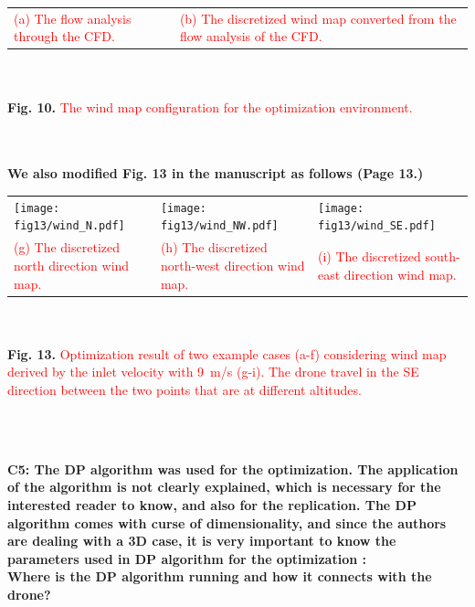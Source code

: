 \documentclass[onecolumn]{IEEEconf}
\begin{document}
\begin{description}
\begin{mdframed}[ linewidth=.75pt, userdefinedwidth=0.9\textwidth]
\begin{tabular}{m{}m{}}
        \small \textcolor{red}{(a) The flow analysis through the CFD.} &
        \small \textcolor{red}{(b) The discretized wind map converted from the flow analysis of the CFD.} \\
    \end{tabular}
    \\~\\
    \textbf{Fig. 10.} \textcolor{red}{The wind map configuration for the optimization environment.}
    \label{fig: wind_map}
 \end{mdframed}     
    ~\\
    ~\pagebreak
    ~\\
   \textbf{We also modified Fig. 13 in the manuscript as follows (Page 13.)}\\
    \begin{mdframed}[ linewidth=.75pt, userdefinedwidth=0.9\textwidth]
    \begin{tabular}{m{}m{}m{}|}
    \texttt{[image: fig13/wind\_N.pdf]}&
    \texttt{[image: fig13/wind\_NW.pdf]}&
    \texttt{[image: fig13/wind\_SE.pdf]}\\
    \small \textcolor{red}{(g) The discretized north direction wind map.} &
    \small \textcolor{red}{(h) The discretized north-west direction wind map.} &
    \small \textcolor{red}{(i) The discretized south-east direction wind map.} \\
    \end{tabular}
    ~\\
    ~\\
    \textbf{Fig. 13.} \textcolor{red}{Optimization result of two example cases (a-f) considering wind map derived by the inlet velocity with 9~m/s (g-i). 
    The drone travel in the SE direction between the two points that are at different altitudes.}
    \label{fig: wind_opt}
 \end{mdframed}       
	~\\
	~\\
    \item \textbf
    {
	C5: The DP algorithm was used for the optimization. The application of the algorithm is not clearly explained, which is necessary for the interested reader to know, and also for the replication. The DP algorithm comes with curse of dimensionality, and since the authors are dealing with a 3D case, it is very important to know the parameters used in DP algorithm for the optimization :~\\  
    Where is the DP algorithm running and how it connects with the drone?~\\
}
\end{description}
\end{document}
